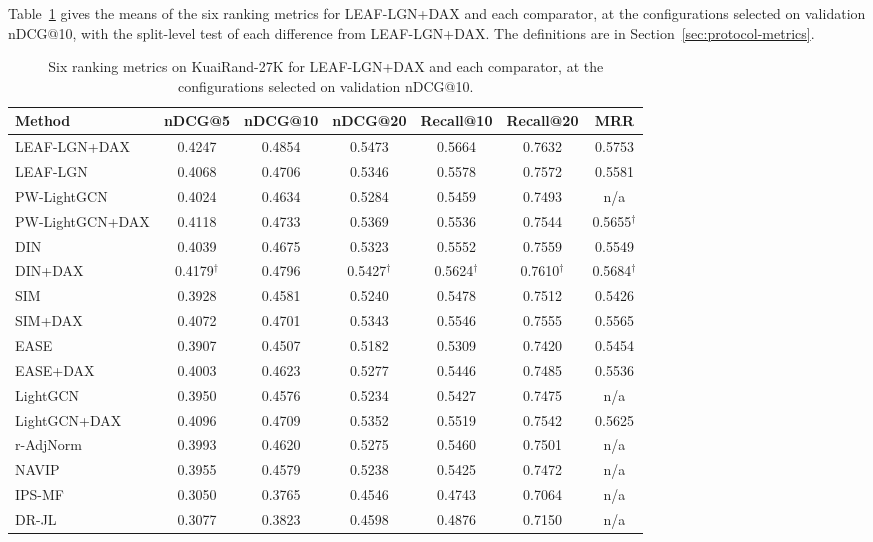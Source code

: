 \documentclass[preprint,12pt,authoryear]{elsarticle}
\begin{document}
Table~\ref{tab:metrics} gives the means of the six ranking metrics for LEAF-LGN+DAX and each comparator, at the configurations selected on validation
nDCG@10, with the split-level test of each difference from LEAF-LGN+DAX. The definitions are in Section~\ref{sec:protocol-metrics}.

\begin{table}[tbp]
\centering
\footnotesize
\caption{Six ranking metrics on KuaiRand-27K for LEAF-LGN+DAX and each comparator, at the configurations selected on validation nDCG@10.}
\label{tab:metrics}
\begin{adjustbox}{max width=\linewidth}
\begin{tabular}{lcccccc}
\toprule
Method & nDCG@5 & nDCG@10 & nDCG@20 & Recall@10 & Recall@20 & MRR \\
\midrule
LEAF-LGN+DAX & 0.4247 & 0.4854 & 0.5473 & 0.5664 & 0.7632 & 0.5753 \\
LEAF-LGN & 0.4068 & 0.4706 & 0.5346 & 0.5578 & 0.7572 & 0.5581 \\
\midrule
PW-LightGCN & 0.4024 & 0.4634 & 0.5284 & 0.5459 & 0.7493 & n/a \\
PW-LightGCN+DAX & 0.4118 & 0.4733 & 0.5369 & 0.5536 & 0.7544 & 0.5655$^{\dagger}$ \\
\midrule
DIN & 0.4039 & 0.4675 & 0.5323 & 0.5552 & 0.7559 & 0.5549 \\
DIN+DAX & 0.4179$^{\dagger}$ & 0.4796 & 0.5427$^{\dagger}$ & 0.5624$^{\dagger}$ & 0.7610$^{\dagger}$ & 0.5684$^{\dagger}$ \\
SIM & 0.3928 & 0.4581 & 0.5240 & 0.5478 & 0.7512 & 0.5426 \\
SIM+DAX & 0.4072 & 0.4701 & 0.5343 & 0.5546 & 0.7555 & 0.5565 \\
EASE & 0.3907 & 0.4507 & 0.5182 & 0.5309 & 0.7420 & 0.5454 \\
EASE+DAX & 0.4003 & 0.4623 & 0.5277 & 0.5446 & 0.7485 & 0.5536 \\
\midrule
LightGCN & 0.3950 & 0.4576 & 0.5234 & 0.5427 & 0.7475 & n/a \\
LightGCN+DAX & 0.4096 & 0.4709 & 0.5352 & 0.5519 & 0.7542 & 0.5625 \\
r-AdjNorm & 0.3993 & 0.4620 & 0.5275 & 0.5460 & 0.7501 & n/a \\
\midrule
NAVIP & 0.3955 & 0.4579 & 0.5238 & 0.5425 & 0.7472 & n/a \\
IPS-MF & 0.3050 & 0.3765 & 0.4546 & 0.4743 & 0.7064 & n/a \\
DR-JL & 0.3077 & 0.3823 & 0.4598 & 0.4876 & 0.7150 & n/a \\

\end{tabular}
\end{adjustbox}
\end{table}
\end{document}
